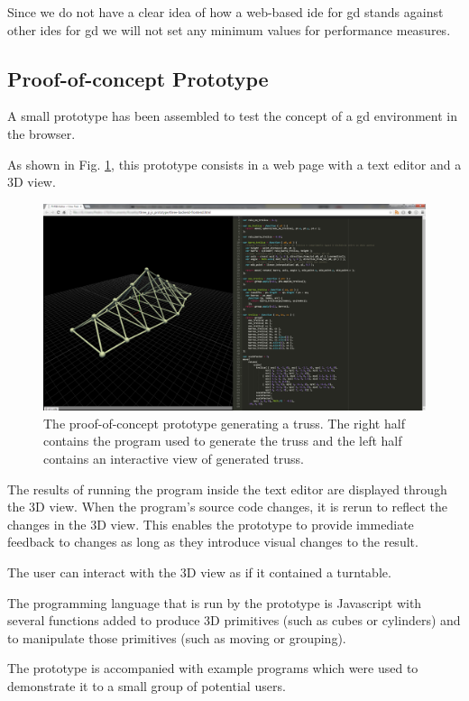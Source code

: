 \documentclass{./llncs2e/llncs}
\begin{document}
	Since we do not have a clear idea of how a web-based \ac{ide} for \ac{gd} stands against other \acp{ide} for \ac{gd} we will not set any minimum values for performance measures.

\subsection{Proof-of-concept Prototype}
	A small prototype has been assembled to test the concept of a \ac{gd} environment in the browser.

	As shown in Fig. \ref{fig:proto:3d:p:editor}, this prototype consists in a web page with a text editor and a 3D view.

	\begin{figure}
	  \centering
	  \includegraphics[width=1.0\textwidth]{img/proto_3d_p_editor}
	    \caption{The proof-of-concept prototype generating a truss. The right half contains the program used to generate the truss and the left half contains an interactive view of generated truss.}
	  \label{fig:proto:3d:p:editor}
	\end{figure} 

	The results of running the program inside the text editor are displayed through the 3D view. 
	When the program's source code changes, it is rerun to reflect the changes in the 3D view. 
	This enables the prototype to provide immediate feedback to changes as long as they introduce visual changes to the result.

	The user can interact with the 3D view as if it contained a turntable.

	The programming language that is run by the prototype is Javascript with several functions added to produce 3D primitives (such as cubes or cylinders) and to manipulate those primitives (such as moving or grouping).

	The prototype is accompanied with example programs which were used to demonstrate it to a small group of potential users.
\end{document}
